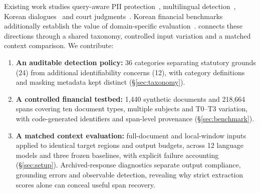 Existing work studies query-aware PII protection~\cite{shen2025piibench}, multilingual detection~\cite{vats2026redact}, Korean dialogues~\cite{fei2024kdpii} and court judgments~\cite{hahm2025thunderdeid}. Korean financial benchmarks additionally establish the value of domain-specific evaluation~\cite{hwang2025twice,lee2025nmixx}. \kiii{} connects these directions through a shared taxonomy, controlled input variation and a matched context comparison. We contribute:
\begin{enumerate}
  \item \textbf{An auditable detection policy:} 36 categories separating statutory grounds (24) from additional identifiability concerns (12), with category definitions and masking metadata kept distinct (\S\ref{sec:taxonomy}).
  \item \textbf{A controlled financial testbed:} 1,440 synthetic documents and 218,664 spans covering ten document types, multiple subjects and T0--T3 variation, with code-generated identifiers and span-level provenance (\S\ref{sec:benchmark}).
  \item \textbf{A matched context evaluation:} full-document and local-window inputs applied to identical target regions and output budgets, across 12 language models and three frozen baselines, with explicit failure accounting (\S\ref{sec:setup}). Archived-response diagnostics separate output compliance, grounding errors and observable detection, revealing why strict extraction scores alone can conceal useful span recovery.
\end{enumerate}
